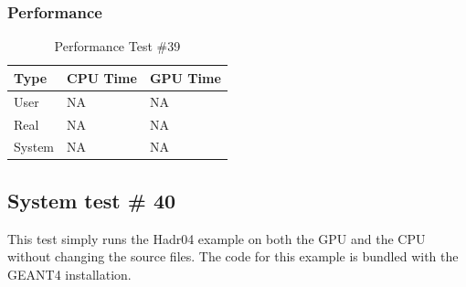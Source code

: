 \documentclass[12pt]{article}
\begin{document}
	\subsubsection{Performance}
		\begin{table}[!htbp]
		\centering
		\caption{Performance Test \#39}\label{_acc}
		\begin{tabular}{lll}
		\toprule
		Type&CPU Time& GPU Time\\\midrule
		User&NA&NA\\
		Real&NA&NA\\
		System&NA&NA\\
		\end{tabular}
		\end{table}
\break
\subsection{System test \# 40}
This test simply runs the Hadr04 example on both the GPU and the CPU without changing the source files. The code for this example is bundled with the GEANT4 installation.\\
\end{document}
